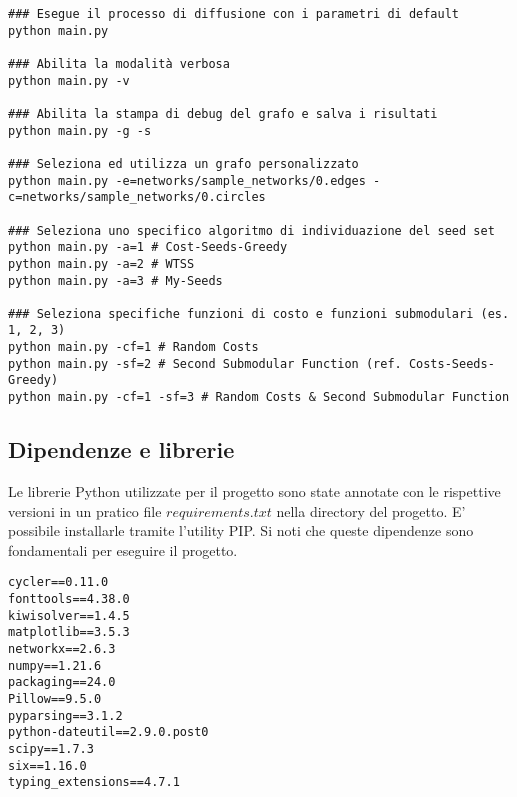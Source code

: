 \begin{code}
\begin{verbatim}
### Esegue il processo di diffusione con i parametri di default
python main.py

### Abilita la modalità verbosa
python main.py -v

### Abilita la stampa di debug del grafo e salva i risultati
python main.py -g -s

### Seleziona ed utilizza un grafo personalizzato
python main.py -e=networks/sample_networks/0.edges -c=networks/sample_networks/0.circles

### Seleziona uno specifico algoritmo di individuazione del seed set
python main.py -a=1 # Cost-Seeds-Greedy
python main.py -a=2 # WTSS
python main.py -a=3 # My-Seeds

### Seleziona specifiche funzioni di costo e funzioni submodulari (es. 1, 2, 3)
python main.py -cf=1 # Random Costs
python main.py -sf=2 # Second Submodular Function (ref. Costs-Seeds-Greedy)
python main.py -cf=1 -sf=3 # Random Costs & Second Submodular Function
\end{verbatim}
\end{code}

\subsection{Dipendenze e librerie}

Le librerie Python utilizzate per il progetto sono state annotate con le rispettive versioni in un pratico file $ requirements.txt $ nella directory del progetto. E' possibile installarle tramite l'utility PIP. Si noti che queste dipendenze sono fondamentali per eseguire il progetto. 

\begin{code}
\begin{verbatim}
cycler==0.11.0
fonttools==4.38.0
kiwisolver==1.4.5
matplotlib==3.5.3
networkx==2.6.3
numpy==1.21.6
packaging==24.0
Pillow==9.5.0
pyparsing==3.1.2
python-dateutil==2.9.0.post0
scipy==1.7.3
six==1.16.0
typing_extensions==4.7.1
\end{verbatim}
\end{code}